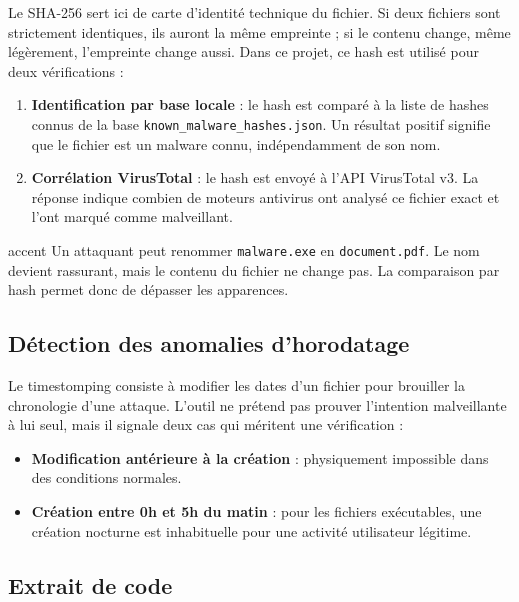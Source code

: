 \documentclass[12pt,a4paper]{article}
\begin{document}
Le SHA-256 sert ici de carte d'identité technique du fichier. Si deux fichiers sont strictement identiques, ils auront la même empreinte ; si le contenu change, même légèrement, l'empreinte change aussi. Dans ce projet, ce hash est utilisé pour deux vérifications :

\begin{enumerate}[itemsep=4pt]
  \item \textbf{Identification par base locale} : le hash est comparé à la liste de hashes connus de la base \texttt{known\_malware\_hashes.json}. Un résultat positif signifie que le fichier est un malware connu, indépendamment de son nom.
  \item \textbf{Corrélation VirusTotal} : le hash est envoyé à l'API VirusTotal v3. La réponse indique combien de moteurs antivirus ont analysé ce fichier exact et l'ont marqué comme malveillant.
\end{enumerate}

\begin{riskbox}{accent}
  \color{white}
  Un attaquant peut renommer \texttt{malware.exe} en \texttt{document.pdf}. Le nom devient rassurant, mais le contenu du fichier ne change pas. La comparaison par hash permet donc de dépasser les apparences.
\end{riskbox}

\subsection{Détection des anomalies d'horodatage}

Le timestomping consiste à modifier les dates d'un fichier pour brouiller la chronologie d'une attaque. L'outil ne prétend pas prouver l'intention malveillante à lui seul, mais il signale deux cas qui méritent une vérification :

\begin{itemize}[itemsep=4pt]
  \item \textbf{Modification antérieure à la création} : physiquement impossible dans des conditions normales.
  \item \textbf{Création entre 0h et 5h du matin} : pour les fichiers exécutables, une création nocturne est inhabituelle pour une activité utilisateur légitime.
\end{itemize}

\subsection{Extrait de code}
\end{document}
